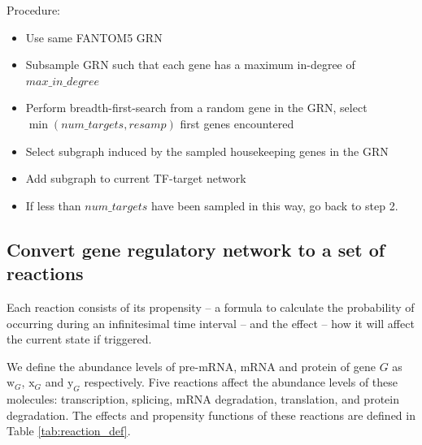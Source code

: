 Procedure:
\begin{itemize}
	\item Use same FANTOM5 GRN
	\item Subsample GRN such that each gene has a maximum in-degree of $max\_in\_degree$
	\item Perform breadth-first-search from a random gene in the GRN, select $\min(num\_targets, resamp)$ first genes encountered
	\item Select subgraph induced by the sampled housekeeping genes in the GRN
	\item Add subgraph to current TF-target network
	\item If less than $num\_targets$ have been sampled in this way, go back to step 2.
\end{itemize}

\subsection{Convert gene regulatory network to a set of reactions} \label{sec:reactions}

Each reaction consists of its propensity -- a formula to calculate the probability of occurring during an infinitesimal time interval -- and the effect -- how it will affect the current state if triggered.


\newcommand{\w}[1]{\text{w}_{#1}}
\newcommand{\x}[1]{\text{x}_{#1}}
\newcommand{\y}[1]{\text{y}_{#1}}


\newcommand{\rs}[1]{\text{R}_{#1}}
\newcommand{\rp}[1]{\text{R}^+_{#1}}
\newcommand{\rn}[1]{\text{R}^-_{#1}}

\newcommand{\wpr}[1]{\text{wpr}_{#1}}
\newcommand{\wsr}[1]{\text{wsr}_{#1}}
\newcommand{\xdr}[1]{\text{xdr}_{#1}}
\newcommand{\ypr}[1]{\text{ypr}_{#1}}
\newcommand{\ydr}[1]{\text{ydr}_{#1}}

\newcommand{\str}[1]{\text{str}_{#1}}
\newcommand{\co}[1]{\text{co}_{#1}}
\newcommand{\ind}[1]{\text{ind}_{#1}}
\newcommand{\hmy}[1]{\text{hmy}_{#1}}
\newcommand{\reg}[1]{\text{reg}_{#1}}
\newcommand{\ba}[1]{\text{ba}_{#1}}

We define the abundance levels of pre-mRNA, mRNA and protein of gene $G$ as $\w G$, $\x G$ and $\y G$ respectively. Five reactions affect the abundance levels of these molecules: transcription, splicing, mRNA degradation, translation, and protein degradation. The effects and propensity functions of these reactions are defined in Table \ref{tab:reaction_def}.

